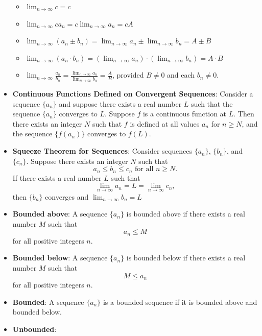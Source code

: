 \documentclass{report}
\begin{document}
\begin{itemize}
        \begin{itemize}
            \item \( \lim_{{n \to \infty}} c = c \)
            \item \( \lim_{{n \to \infty}} c a_n = c \lim_{{n \to \infty}} a_n = cA \)
            \item \( \lim_{{n \to \infty}} (a_n \pm b_n) = \lim_{{n \to \infty}} a_n \pm \lim_{{n \to \infty}} b_n = A \pm B \)
            \item \( \lim_{{n \to \infty}} (a_n \cdot b_n) = (\lim_{{n \to \infty}} a_n) \cdot (\lim_{{n \to \infty}} b_n) = A \cdot B \)
            \item \( \lim_{{n \to \infty}} \frac{a_n}{b_n} = \frac{\lim_{{n \to \infty}} a_n}{\lim_{{n \to \infty}} b_n} = \frac{A}{B} \), provided \( B \neq 0 \) and each \( b_n \neq 0 \).
        \end{itemize}
    \item \textbf{Continuous Functions Defined on Convergent Sequences}:
        Consider a sequence \( \{a_n\} \) and suppose there exists a real number \( L \) such that the sequence \( \{a_n\} \) converges to \( L \). Suppose \( f \) is a continuous function at \( L \). Then there exists an integer \( N \) such that \( f \) is defined at all values \( a_n \) for \( n \geq N \), and the sequence \( \{f(a_n)\} \) converges to \( f(L) \).
    \item \textbf{Squeeze Theorem for Sequences}:           Consider sequences \( \{a_n\} \), \( \{b_n\} \), and \( \{c_n\} \). Suppose there exists an integer \( N \) such that
        \[ a_n \leq b_n \leq c_n \text{ for all } n \geq N. \]
        If there exists a real number \( L \) such that
        \[ \lim_{{n \to \infty}} a_n = L = \lim_{{n \to \infty}} c_n, \]
        then \( \{b_n\} \) converges and \( \lim_{{n \to \infty}} b_n = L \)
    \item \textbf{Bounded above}:           A sequence \( \{a_n\} \) is bounded above if there exists a real number \( M \) such that
        \[ a_n \leq M \]
        for all positive integers \( n \).
    \item \textbf{Bounded below}:
        A sequence \( \{a_n\} \) is bounded below if there exists a real number \( M \) such that
        \[ M \leq a_n \]
        for all positive integers \( n \).
    \item \textbf{Bounded}:
        A sequence \( \{a_n\} \) is a bounded sequence if it is bounded above and bounded below. 
    \item \textbf{Unbounded}:

\end{itemize}
\end{document}
